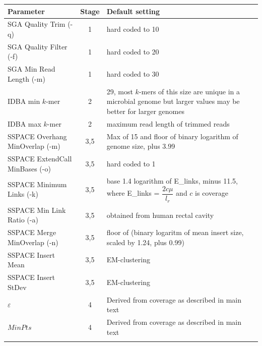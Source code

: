 \documentclass{bioinfo}
\begin{document}
\begin{table}[!t]
{\begin{tabular}{l|c|l}\toprule
Parameter                       & Stage & Default setting  \\\midrule
SGA Quality Trim (-q)           & 1     & hard coded to 10 \\
SGA Quality Filter (-f)         & 1     & hard coded to 20  \\
SGA Min Read Length (-m)        & 1     & hard coded to 30 \\
IDBA min $k$-mer                & 2     & 29, most $k$-mers of this size are unique in a microbial genome but larger values may be better for larger genomes \\
IDBA max $k$-mer                & 2     & maximum read length of trimmed reads \\
SSPACE Overhang MinOverlap (-m) & 3,5   & Max of 15 and floor of binary logarithm of genome size, plus 3.99  \\
SSPACE ExtendCall MinBases (-o) & 3,5   & hard coded to 1 \\
SSPACE Minimum Links (-k)       & 3,5   & base 1.4 logarithm of E\_links, minus 11.5, where E\_links = $\dfrac{2c\mu}{l_r}$ and $c$ is coverage \\
SSPACE Min Link Ratio (-a)      & 3,5   & obtained from human rectal cavity \\
SSPACE Merge MinOverlap (-n)    & 3,5   & floor of (binary logaritm of mean insert size, scaled by 1.24, plus 0.99) \\
SSPACE Insert Mean 	        & 3,5   & EM-clustering \\
SSPACE Insert StDev             & 3,5   & EM-clustering \\
$\varepsilon$                   & 4     & Derived from coverage as described in main text \\
$MinPts$                        & 4     & Derived from coverage as described in main text \\
\botrule \\
\end{tabular}}{}
\end{table}
\end{document}
